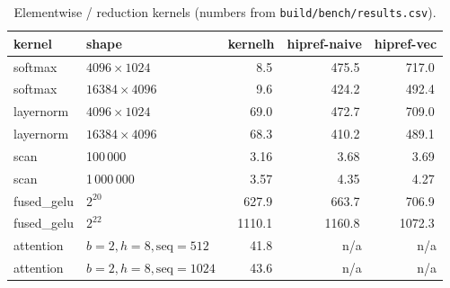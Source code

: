 \documentclass[10pt,twoside]{article}
\newcommand{\gflops}{\,\text{GFLOPS}}
\newcommand{\gbs}{\,\text{GB/s}}
\begin{document}
\begin{table}[H]
\centering
\caption{Elementwise / reduction kernels (numbers from \texttt{build/bench/results.csv}).}
\label{tab:elem}
\begin{tabular}{@{}llrrr@{}}
\toprule
kernel & shape & kernelh & hipref-naive & hipref-vec \\
\midrule
softmax    & $4096\times1024$  & 8.5\gbs   & 475.5\gbs & 717.0\gbs \\
softmax    & $16384\times4096$ & 9.6\gbs   & 424.2\gbs & 492.4\gbs \\
layernorm  & $4096\times1024$  & 69.0\gbs  & 472.7\gbs & 709.0\gbs \\
layernorm  & $16384\times4096$ & 68.3\gbs  & 410.2\gbs & 489.1\gbs \\
scan       & 100\,000          & 3.16\gbs  & 3.68\gbs  & 3.69\gbs \\
scan       & 1\,000\,000        & 3.57\gbs  & 4.35\gbs  & 4.27\gbs \\
fused\_gelu & $2^{20}$         & 627.9\gbs & 663.7\gbs & 706.9\gbs \\
fused\_gelu & $2^{22}$         & 1110.1\gbs & 1160.8\gbs & 1072.3\gbs \\
attention & $b{=}2,h{=}8,\mathrm{seq}{=}512$  & 41.8\gflops & n/a & n/a \\
attention & $b{=}2,h{=}8,\mathrm{seq}{=}1024$ & 43.6\gflops & n/a & n/a \\
\bottomrule
\end{tabular}
\end{table}
\end{document}
